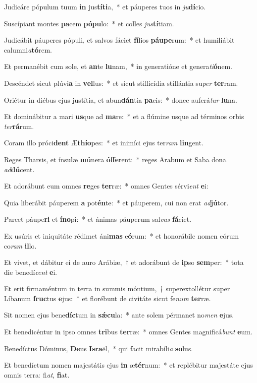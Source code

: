 \item Judicáre pópulum tuum \textbf{in} jus\textbf{tí}\textbf{ti}a,~* et páuperes tuos in \textit{ju}\textbf{dí}cio.
\item Suscípiant montes \textbf{pa}cem \textbf{pó}\textbf{pu}lo:~* et colles \textit{jus}\textbf{tí}tiam.
\item Judicábit páuperes pópuli, et salvos fáciet \textbf{fí}lios \textbf{páu}\textbf{pe}rum:~* et humiliábit calumni\textit{a}\textbf{tó}rem.
\item Et permanébit cum sole, et \textbf{an}te \textbf{lu}nam,~* in generatióne et genera\textit{ti}\textbf{ó}nem.
\item Descéndet sicut plúvi\textbf{a} in \textbf{vel}lus:~* et sicut stillicídia stillántia su\textit{per} \textbf{ter}ram.
\item Oriétur in diébus ejus justítia, et abun\textbf{dán}tia \textbf{pa}cis:~* donec auferá\textit{tur} \textbf{lu}na.
\item Et dominábitur a mari \textbf{us}que ad \textbf{ma}re:~* et a flúmine usque ad términos orbis \textit{ter}\textbf{rá}rum.
\item Coram illo próci\textbf{dent} Æ\textbf{thí}\textbf{o}pes:~* et inimíci ejus ter\textit{ram} \textbf{lin}gent.
\item Reges Tharsis, et ínsulæ \textbf{mú}nera \textbf{óf}\textbf{fe}rent:~* reges Arabum et Saba dona \textit{ad}\textbf{dú}cent.
\item Et adorábunt eum omnes \textbf{re}ges \textbf{ter}ræ:~* omnes Gentes sérvi\textit{ent} \textbf{e}i:
\item Quia liberábit páuperem \textbf{a} pot\textbf{én}te:~* et páuperem, cui non erat \textit{ad}\textbf{jú}tor.
\item Parcet páupe\textbf{ri} et \textbf{ín}\textbf{o}pi:~* et ánimas páuperum sal\textit{vas} \textbf{fá}ciet.
\item Ex usúris et iniquitáte rédimet áni\textbf{mas} e\textbf{ó}rum:~* et honorábile nomen eórum co\textit{ram} \textbf{il}lo.
\item Et vivet, et dábitur ei de auro Arábiæ,~† et adorábunt de \textbf{ip}so \textbf{sem}per:~* tota die benedí\textit{cent} \textbf{e}i.
\item Et erit firmaméntum in terra in summis móntium,~† superextollétur super Líbanum \textbf{fruc}tus \textbf{e}jus:~* et florébunt de civitáte sicut fe\textit{num} \textbf{ter}ræ.
\item Sit nomen ejus bene\textbf{díc}tum in \textbf{sǽ}\textbf{cu}la:~* ante solem pérmanet no\textit{men} \textbf{e}jus.
\item Et benedicéntur in ipso omnes \textbf{tri}bus \textbf{ter}ræ:~* omnes Gentes magnificá\textit{bunt} \textbf{e}um.
\item Benedíctus Dóminus, \textbf{De}us \textbf{Is}\textbf{ra}ël,~* qui facit mirabíli\textit{a} \textbf{so}lus.
\item Et benedíctum nomen majestátis ejus \textbf{in} æ\textbf{tér}num:~* et replébitur majestáte ejus omnis terra: fi\textit{at}, \textbf{fi}at.
